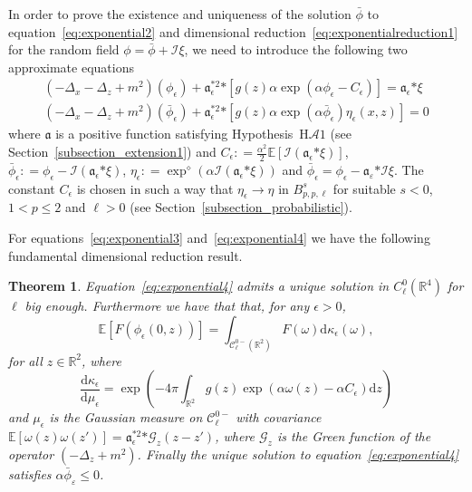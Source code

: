 \documentclass[a4paper,10pt]{article}
\newcommand{\asterisk}{\mathord{*}}
\newcommand{\mathd}{\mathrm{d}}
\newtheorem{theorem}{Theorem}
\begin{document}
In order to prove the existence and uniqueness of the solution $\bar{\phi}$ to
equation~{\eqref{eq:exponential2}} and dimensional
reduction~{\eqref{eq:exponentialreduction1}} for the random field $\phi =
\bar{\phi} + \mathcal{I} \xi$, we need to introduce the following two
approximate equations
\begin{eqnarray}
  & (- \Delta_x - \Delta_z + m^2) (\phi_{\epsilon}) +
  \mathfrak{a}_{\epsilon}^{\asterisk 2} \asterisk [g (z) \alpha \exp (\alpha
  \phi_{\epsilon} - C_{\epsilon})] = \mathfrak{a}_{\epsilon} \asterisk \xi & 
  \label{eq:exponential3}\\
  & (- \Delta_x - \Delta_z + m^2) (\bar{\phi}_{\epsilon}) +
  \mathfrak{a}_{\epsilon}^{\asterisk 2} \asterisk [g (z) \alpha \exp (\alpha
  \bar{\phi}_{\epsilon}) \eta_{\epsilon} (x, z)] = 0 & 
  \label{eq:exponential4}
\end{eqnarray}
where $\mathfrak{a}$ is a positive function satisfying
Hypothesis~H$\mathcal{A} 1$ (see Section~\ref{subsection_extension1}) and
$C_{\epsilon} : = \frac{\alpha^2}{2} \mathbb{E} [\mathcal{I}
(\mathfrak{a}_{\epsilon} \asterisk \xi)]$, $\bar{\phi}_{\epsilon} : =
\phi_{\epsilon} - \mathcal{I} (\mathfrak{a}_{\epsilon} \asterisk \xi)$,
$\eta_{\epsilon} : = \exp^{\diamond} (\alpha \mathcal{I}
(\mathfrak{a}_{\epsilon} \asterisk \xi))$ and $\bar{\phi}_{\epsilon} =
\phi_{\epsilon} - \mathfrak{a}_{\varepsilon} \asterisk \mathcal{I} \xi$. The
constant $C_{\epsilon}$ is chosen in such a way that $\eta_{\epsilon}
\rightarrow \eta$ in $B^s_{p, p, \ell}$ for suitable $s < 0$, $1 < p \leqslant
2$ and $\ell > 0$ (see Section~\ref{subsection_probabilistic}).

For equations~{\eqref{eq:exponential3}} and~{\eqref{eq:exponential4}} we have
the following fundamental dimensional reduction result.

\begin{theorem}
  \label{theorem_regularexponential}Equation~{\eqref{eq:exponential4}} admits
  a unique solution in $C^0_{\ell} (\mathbb{R}^4)$ for $\ell$ big enough.
  Furthermore we have that that, for any $\epsilon > 0$,
  \begin{equation}
    \mathbb{E} [F (\phi_{\epsilon} (0, z))] = \int_{\mathcal{C}^{0 -}_{\ell}
    (\mathbb{R}^2)} F (\omega) \mathd \kappa_{\epsilon} (\omega)
    \label{eq:exponential5},
  \end{equation}
  for all $z \in \mathbb{R}^2$, where
  \[ \frac{\mathd \kappa_{\epsilon}}{\mathd \mu_{\epsilon}} = \exp \left( - 4
     \pi \int_{\mathbb{R}^2} g (z) \exp (\alpha \omega (z) - \alpha
     C_{\epsilon}) \mathd z \right) \]
  and $\mu_{\epsilon}$ is the Gaussian measure on $\mathcal{C}^{0 -}_{\ell}$
  with covariance $\mathbb{E} [\omega (z) \omega (z')] =
  \mathfrak{a}^{\asterisk 2}_{\epsilon} \asterisk \mathcal{G}_z (z - z')$,
  where $\mathcal{G}_z$ is the Green function of the operator $(- \Delta_z +
  m^2)$. Finally the unique solution to equation~{\eqref{eq:exponential4}}
  satisfies $\alpha \bar{\phi}_{\varepsilon} \leqslant 0$.
\end{theorem}
\end{document}
